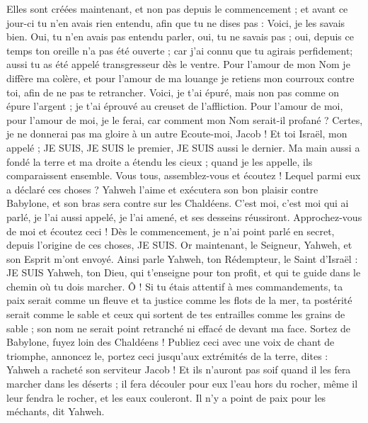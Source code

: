 \begin{multicols}{2}
Elles sont créées maintenant, et non pas depuis le commencement ; et avant ce jour-ci tu n'en avais rien entendu, afin que tu ne dises pas : Voici, je les savais bien.
Oui, tu n'en avais pas entendu parler, oui, tu ne savais pas ; oui, depuis ce temps ton oreille n'a pas été ouverte ; car j'ai connu que tu agirais perfidement; aussi tu as été appelé transgresseur dès le ventre.
Pour l'amour de mon Nom je diffère ma colère, et pour l'amour de ma louange je retiens mon courroux contre toi, afin de ne pas te retrancher.
Voici, je t'ai épuré, mais non pas comme on épure l'argent ; je t'ai éprouvé au creuset de l'affliction.
Pour l'amour de moi, pour l'amour de moi, je le ferai, car comment mon Nom serait-il profané ? Certes, je ne donnerai pas ma gloire à un autre
Ecoute-moi, Jacob ! Et toi Israël, mon appelé ; JE SUIS, JE SUIS le premier, JE SUIS aussi le dernier.
Ma main aussi a fondé la terre et ma droite a étendu les cieux ; quand je les appelle, ils comparaissent ensemble.
Vous tous, assemblez-vous et écoutez ! Lequel parmi eux a déclaré ces choses ? Yahweh l'aime et exécutera son bon plaisir contre Babylone, et son bras sera contre sur les Chaldéens.
C'est moi, c'est moi qui ai parlé, je l'ai aussi appelé, je l'ai amené, et ses desseins réussiront.
Approchez-vous de moi et écoutez ceci ! Dès le commencement, je n'ai point parlé en secret, depuis l'origine de ces choses, JE SUIS. Or maintenant, le Seigneur, Yahweh, et son Esprit m'ont envoyé.
Ainsi parle Yahweh, ton Rédempteur, le Saint d'Israël : JE SUIS Yahweh, ton Dieu, qui t'enseigne pour ton profit, et qui te guide dans le chemin où tu dois marcher.
Ô ! Si tu étais attentif à mes commandements, ta paix serait comme un fleuve et ta justice comme les flots de la mer,
ta postérité serait comme le sable et ceux qui sortent de tes entrailles comme les grains de sable ; son nom ne serait point retranché ni effacé de devant ma face.
Sortez de Babylone, fuyez loin des Chaldéens ! Publiez ceci avec une voix de chant de triomphe, annoncez le, portez ceci jusqu'aux extrémités de la terre, dites : Yahweh a racheté son serviteur Jacob !
Et ils n'auront pas soif quand il les fera marcher dans les déserts ; il fera découler pour eux l'eau hors du rocher, même il leur fendra le rocher, et les eaux couleront.
Il n'y a point de paix pour les méchants, dit Yahweh.

\end{multicols}

